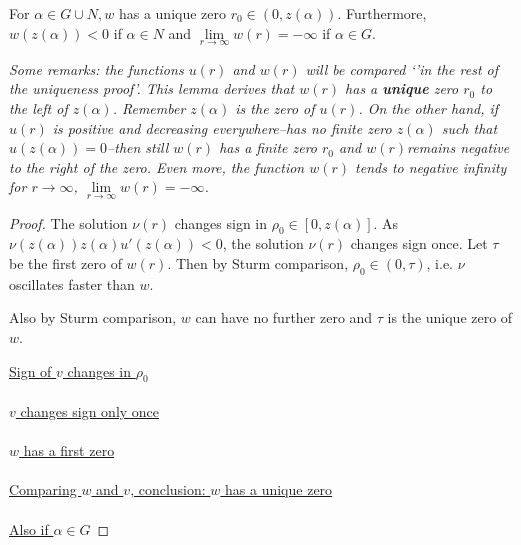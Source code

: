 \begin{lemma}\label{wq}For $\alpha\in G\cup N,w$ has a unique zero $r_0\in(0,z(\alpha)).$ Furthermore, $w(z(\alpha))<0$ if $\alpha\in N$ and $\underset{r\to\infty}{\lim}w(r)=-\infty$ if $\alpha\in G$.

\emph{Some remarks: the functions $u(r)$ and $w(r)$ will be compared `'in the rest of the uniqueness proof'. This lemma derives that $w(r)$ has a \textbf{unique} zero $r_0$ to the left of $z(\alpha)$. Remember $z(\alpha)$ is the zero of $u(r)$. On the other hand, if $u(r)$ is positive and decreasing everywhere--has no finite zero $z(\alpha)$ such that $u(z(\alpha))=0$--then still $w(r)$ has a finite zero $r_0$ and $w(r)$remains negative to the right of the zero. Even more, the function $w(r)$ tends to negative infinity for $r\to\infty$, $\underset{r\to\infty}{\lim}w(r)=-\infty$.}\\[2cm]
\begin{proof}
The solution $\nu(r)$ changes sign in $\rho_0\in[0,z(\alpha)]$. As $\nu(z(\alpha))z(\alpha)u'(z(\alpha))<0$, the solution $\nu(r)$ changes sign once. Let $\tau$ be the first zero of $w(r)$. Then by Sturm comparison, $\rho_0\in(0,\tau)$, i.e. $\nu$ oscillates faster than $w$.

Also by Sturm comparison, $w$ can have no further zero and $\tau$ is the unique zero of $w$.

\underline{Sign of $v$ changes in $\rho_0$} \\ \\

\underline{$v$ changes sign only once} \\ \\

\underline{$w$ has a first zero} \\ \\

\underline{Comparing $w$ and $v$, conclusion: $w$ has a unique zero} \\ \\

\underline{Also if $\alpha\in G$}


\end{proof}
\end{lemma}
